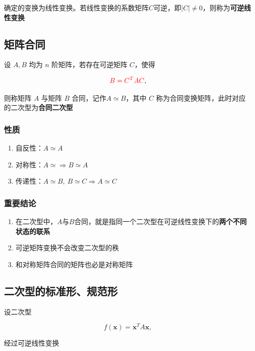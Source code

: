\documentclass[./linear_algebra.tex]{subfiles}
\begin{document}
    \noindent
    确定的变换为线性变换。若线性变换的系数矩阵$C$可逆，即$|C| \neq 0$，则称为\textbf{可逆线性变换}

    \subsection{矩阵合同}

    设 $A,B$ 均为 $n$ 阶矩阵，若存在可逆矩阵 $C$，使得

    \[
            {\color{red}{B=C^TAC}},
    \]

    \noindent
    则称矩阵 $A$ 与矩阵 $B$ 合同，记作$A\simeq B$，其中 $C$ 称为合同变换矩阵，此时对应的二次型为\textbf{合同二次型}

    \subsubsection{性质}

    \begin{enumerate}
        \item 自反性：$A\simeq A$
        \item 对称性：$A\simeq \Rightarrow B\simeq A$
        \item 传递性：$A\simeq B,\ B\simeq C\Rightarrow A\simeq C$
    \end{enumerate}

    \subsubsection{重要结论}

    \begin{enumerate}
        \item 在二次型中，$A$与$B$合同，就是指同一个二次型在可逆线性变换下的\textbf{两个不同状态的联系}
        \item 可逆矩阵变换不会改变二次型的秩
        \item 和对称矩阵合同的矩阵也必是对称矩阵
    \end{enumerate}

    \subsection{二次型的标准形、规范形}

    设二次型

    \[
        f(\boldsymbol{x})=\boldsymbol{x}^{T}A\boldsymbol{x},
    \]

    \noindent
    经过可逆线性变换
\end{document}
